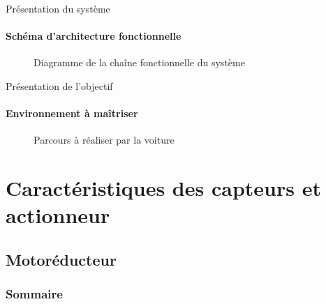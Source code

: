 \documentclass[french, handout]{beamer}
\begin{document}
        \begin{frame}{Présentation du système}
        \framesubtitle{\quad Schéma d'architecture fonctionnelle}
        \begin{figure}[htbp]
          \centering
          
          \caption{Diagramme de la chaîne fonctionnelle du système}
        \end{figure}
        \end{frame}
        
        \begin{frame}{Présentation de l'objectif}
        \framesubtitle{Environnement à maîtriser}
        \begin{figure}[htbp]
          \centering
          
          \caption{Parcours à réaliser par la voiture}
        \end{figure}
        \end{frame}
    
    \section{Caractéristiques des capteurs et actionneur}
        
        \subsection{Motoréducteur}
        \begin{frame}
        \frametitle{Sommaire}
        \tableofcontents[sections=2, currentsubsection]
        \end{frame} 
        
\end{document}
